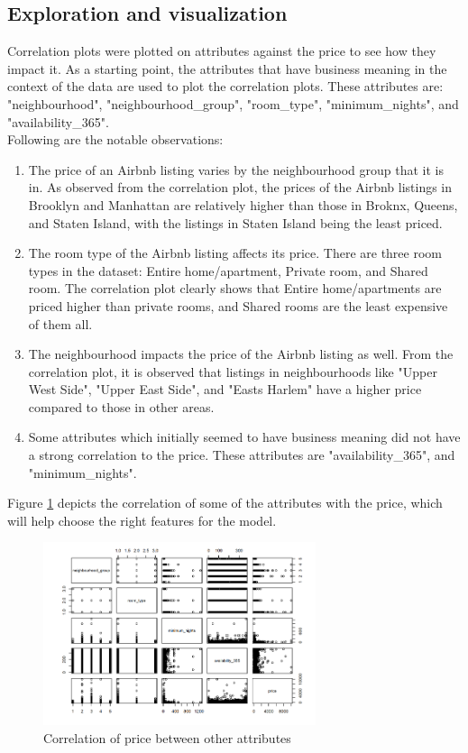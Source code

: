 \documentclass{sig-alternate}
\begin{document}
	\subsection{Exploration and visualization} 
	Correlation plots were plotted on attributes against the price to see how they impact it. As a starting point, the attributes that have business meaning in the context of the data are used to plot the correlation plots. These attributes are: "neighbourhood", "neighbourhood\_group", "room\_type", "minimum\_nights", and "availability\_365".\\
	Following are the notable observations:
	\begin{enumerate}
		\item The price of an Airbnb listing varies by the neighbourhood group that it is in. As observed from the correlation plot, the prices of the Airbnb listings in Brooklyn and Manhattan are relatively higher than those in Broknx, Queens, and Staten Island, with the listings in Staten Island being the least priced.
		\item The room type of the Airbnb listing affects its price. There are three room types in the dataset: Entire home/apartment, Private room, and Shared room. The correlation plot clearly shows that Entire home/apartments are priced higher than private rooms, and Shared rooms are the least expensive of them all.
		\item The neighbourhood impacts the price of the Airbnb listing as well. From the correlation plot, it is observed that listings in neighbourhoods like "Upper West Side", "Upper East Side", and "Easts Harlem" have a higher price compared to those in other areas.
		\item Some attributes which initially seemed to have business meaning did not have a strong correlation to the price. These attributes are "availability\_365", and "minimum\_nights".
	\end{enumerate}
	Figure \ref{corr} depicts the correlation of some of the attributes with the price, which will help choose the right features for the model. 
	\begin{figure}[ht]
		\includegraphics[width=8cm]{corr.png}
		\centering
		\caption{Correlation of price between other attributes}
		\label{corr}
	\end{figure}
	
\end{document}
